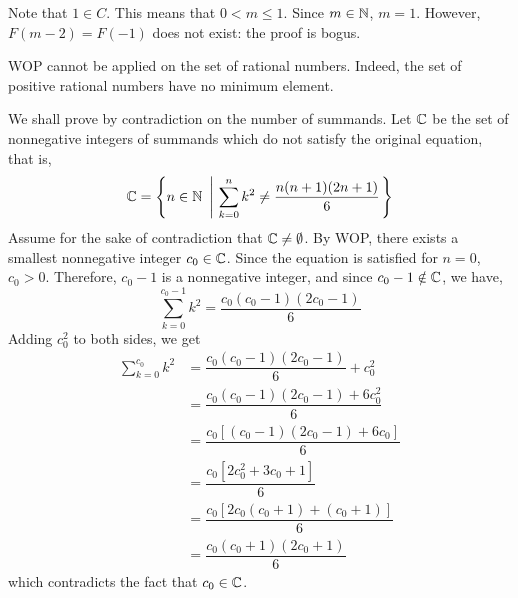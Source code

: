 \begin{pr}
    Note that $1 \in C$. This means that $0 < m \leq 1$. Since $m \in \mathbb{N}$,
    $m = 1$. However, $F(m - 2) = F(-1)$ does not exist: the proof is bogus.
\end{pr}

\begin{pr}
    WOP cannot be applied on the set of rational numbers. Indeed, the set
    of positive rational numbers have no minimum element.
\end{pr}

\begin{pr}
    We shall prove by contradiction on the number of summands. Let $\mathbb{C}$
    be the set of nonnegative integers of summands which do not satisfy
    the original equation, that is,
    \begin{equation*}
        \ms{C} = \left\{ n \in \ms{N} \ \left| \ \sum_{k=0}^{n} k^2 \neq \dfrac{n(n + 1)(2n+1)}{6} \right. \right\}
    \end{equation*}
    Assume for the sake of contradiction that $\mathbb{C} \neq \emptyset$.
    By WOP, there exists a smallest nonnegative integer $c_0 \in \mathbb{C}$.
    Since the equation is satisfied for $n = 0$, $c_0 > 0$. Therefore,
    $c_0 - 1$ is a nonnegative integer, and since $c_0 - 1 \notin \mathbb{C}$, we have,
    \begin{equation*}
        \sum_{k=0}^{c_0-1} k^2 = \dfrac{c_0(c_0-1)(2c_0-1)}{6}
    \end{equation*}
    Adding $c_0^2$ to both sides, we get
    \begin{align*}
        \sum_{k=0}^{c_0} k^2 &= \dfrac{c_0(c_0-1)(2c_0-1)}{6} + c_0^2 \\
        &= \dfrac{c_0(c_0-1)(2c_0-1) + 6c_0^2}{6} \\
        &= \dfrac{c_0\left[(c_0-1)(2c_0-1) + 6c_0\right]}{6} \\
        &= \dfrac{c_0\left[2c_0^2 + 3c_0 + 1\right]}{6} \\
        &= \dfrac{c_0\left[2c_0(c_0 + 1) + (c_0 + 1)\right]}{6} \\
        &= \dfrac{c_0(c_0 + 1)(2c_0 + 1)}{6}
    \end{align*}
    which contradicts the fact that $c_0 \in \mathbb{C}$.
\end{pr}

